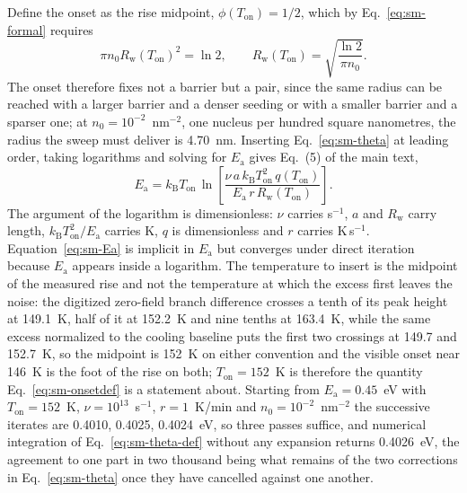\documentclass[reprint,twocolumn,prb,amsmath,amssymb,superscriptaddress,floatfix]{revtex4-2}
\newcommand{\kB}{k_{\mathrm{B}}}
\newcommand{\Ea}{E_{\mathrm{a}}}
\newcommand{\Ton}{T_{\mathrm{on}}}
\begin{document}
Define the onset as the rise midpoint, $\phi(\Ton)=1/2$, which by Eq.~\eqref{eq:sm-formal}
requires
\begin{equation}
  \pi n_{0}R_{\mathrm{w}}(\Ton)^{2}=\ln 2,
  \qquad
  R_{\mathrm{w}}(\Ton)=\sqrt{\frac{\ln2}{\pi n_{0}}} .
  \label{eq:sm-onsetdef}
\end{equation}
The onset therefore fixes not a barrier but a pair, since the same radius can be reached with a
larger barrier and a denser seeding or with a smaller barrier and a sparser one; at
$n_{0}=10^{-2}$~nm$^{-2}$, one nucleus per hundred square nanometres, the radius the sweep must
deliver is 4.70~nm. Inserting Eq.~\eqref{eq:sm-theta} at leading order, taking logarithms and
solving for $\Ea$ gives Eq.~(5) of the main text,
\begin{equation}
  \Ea = \kB\Ton\,\ln\!\left[\frac{\nu\,a\,\kB\Ton^{2}\,q(\Ton)}
                                 {\Ea\,r\,R_{\mathrm{w}}(\Ton)}\right].
  \label{eq:sm-Ea}
\end{equation}
The argument of the logarithm is dimensionless: $\nu$ carries s$^{-1}$, $a$ and
$R_{\mathrm{w}}$ carry length, $\kB\Ton^{2}/\Ea$ carries K, $q$ is dimensionless and $r$
carries K\,s$^{-1}$. Equation~\eqref{eq:sm-Ea} is implicit in $\Ea$ but converges under direct
iteration because $\Ea$ appears inside a logarithm. The temperature to insert is the midpoint of
the measured rise and not the temperature at which the excess first leaves the noise: the
digitized zero-field branch difference crosses a tenth of its peak height at 149.1~K, half of it
at 152.2~K and nine tenths at 163.4~K, while the same excess normalized to the cooling baseline
puts the first two crossings at 149.7 and 152.7~K, so the midpoint is 152~K on either convention
and the visible onset near 146~K is the foot of the rise on both;
$\Ton=152$~K is therefore the quantity Eq.~\eqref{eq:sm-onsetdef} is a statement about. Starting from
$\Ea=0.45$~eV with
$\Ton=152$~K, $\nu=10^{13}$~s$^{-1}$, $r=1$~K/min and $n_{0}=10^{-2}$~nm$^{-2}$ the successive
iterates are 0.4010, 0.4025, 0.4024~eV, so three passes suffice, and numerical integration of
Eq.~\eqref{eq:sm-theta-def} without any expansion returns 0.4026~eV, the agreement to one part
in two thousand being what remains of the two corrections in Eq.~\eqref{eq:sm-theta} once they
have cancelled against one another.
\end{document}

